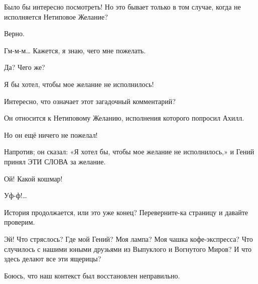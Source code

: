 \documentclass[../main.tex]{subfiles}
\begin{document}
\begin{Dialogue}
\begin{sublevel}
\begin{sublevel}
 Было бы интересно посмотреть! Но это бывает только в том случае, когда не исполняется Нетиповое Желание?

 Верно.

 Гм-м-м\ldots{} Кажется, я знаю, чего мне пожелать.

 Да? Чего же?

 Я бы хотел, чтобы мое желание не исполнилось!



\begin{customlevel}{0}

 Интересно, что означает этот загадочный комментарий?

 Он относится к Нетиповому Желанию, исполнения которого попросил Ахилл.

 Но он ещё ничего не пожелал!

 Напротив; он сказал: «Я хотел бы, чтобы мое желание не исполнилось,» и Гений принял ЭТИ СЛОВА за желание.


 Ой! Какой кошмар!


 Уф-ф!\ldots{}

 История продолжается, или это уже конец? Переверните-ка страницу и давайте проверим.



\end{customlevel}


 Эй! Что стряслось? Где мой Гений? Моя лампа? Моя чашка кофе-экспресса? Что случилось с нашими юными друзьями из Выпуклого и Вогнутого Миров? И что здесь делают все эти ящерицы?

 Боюсь, что наш контекст был восстановлен неправильно.


\end{sublevel}
\end{sublevel}
\end{Dialogue}
\end{document}
